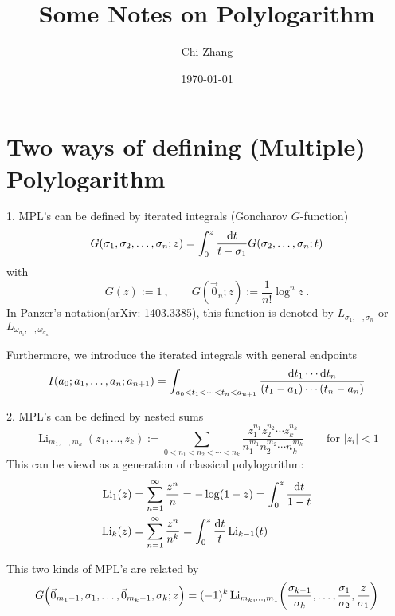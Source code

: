 \documentclass[12pt]{article}
\title{Some Notes on Polylogarithm}
\author{Chi Zhang}
\date{\today}
\begin{document}
\maketitle

\section{Two ways of defining (Multiple) Polylogarithm} \label{sec:1}



1. MPL's can be defined by iterated integrals  (Goncharov $G$-function) 
\begin{equation}
    G(\sigma_{1},\sigma_{2},\ldots,\sigma_{n};z)=\int_{0}^{z}\frac{\mathrm{d} t}{t-\sigma_{1}} G(\sigma_{2},\ldots,\sigma_{n};t)
    \label{Gfunction}
\end{equation}
with 
\begin{equation}
    G(z):=1 \:,\qquad G(\vec{0}_{n};z):=\frac{1}{n!}\log^{n}z \:.
\end{equation}
In Panzer's notation(arXiv: 1403.3385), this function is denoted by $L_{\sigma_{1},\cdots ,\sigma_{n}}$ or $L_{\omega_{\sigma_{1}},\cdots ,\omega_{\sigma_{n}}}$  

Furthermore, we introduce the iterated integrals with general endpoints
\begin{equation}
    I(a_{0};a_{1},\ldots,a_{n};a_{n+1})=\int_{a_{0}<t_{1}<\cdots<t_{n}<a_{n+1}}\frac{\mathrm{d} t_{1}\cdots \mathrm{d} t_{n}}{(t_{1}-a_{1})\cdots (t_{n}-a_{n})}
\end{equation}

2. MPL's can be defined by nested sums
\begin{equation}
    \operatorname{Li}_{m_{1},\ldots,m_{k}}(z_{1},\ldots,z_{k}) := 
    \sum_{0<n_{1}<n_{2}<\cdots <n_{k}}\frac{z_{1}^{n_{1}}z_{2}^{n_{2}}\cdots z_{k}^{n_{k}}}{n_{1}^{m_{1}}n_{2}^{m_{2}}\cdots n_{k}^{m_{k}} }  \qquad \text{for }\lvert z_{i}\rvert <1
\end{equation}
This can be viewd as a generation of classical polylogarithm:
\begin{align}
    \operatorname{Li}_{1}(z) &= \sum_{n=1}^{\infty}\frac{z^{n}}{n} = -\log(1-z) =\int_{0}^{z}\frac{\mathrm{d} t}{1-t} \\
    \operatorname{Li}_{k}(z) &= \sum_{n=1}^{\infty}\frac{z^{n}}{n^{k}} =\int_{0}^{z}\frac{\mathrm{d} t}{t}\operatorname{Li}_{k-1}(t)
\end{align}

This two kinds of MPL's are related by
\begin{equation}
    G\Bigl(\vec{0}_{m_{1}-1},\sigma_{1},\ldots,\vec{0}_{m_{k}-1},\sigma_{k};z\Bigr)=
    (-1)^{k}\operatorname{Li}_{m_{k},\ldots,m_{1}}\biggl(\frac{\sigma_{k-1}}{\sigma_{k}},\ldots,\frac{\sigma_{1}}{\sigma_{2}},\frac{z}{\sigma_{1}}\biggr)
\end{equation}
\end{document}
